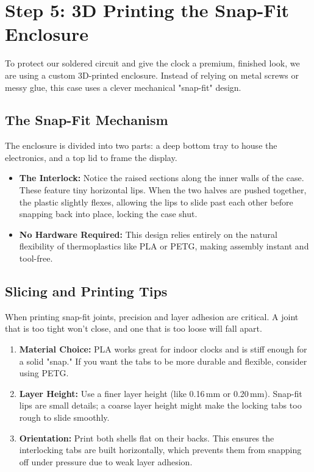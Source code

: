 \documentclass[11pt,a4paper]{article}
\begin{document}
\section{Step 5: 3D Printing the Snap-Fit Enclosure}
To protect our soldered circuit and give the clock a premium, finished look, we are using a custom 3D-printed enclosure. Instead of relying on metal screws or messy glue, this case uses a clever mechanical "snap-fit" design.

\subsection*{The Snap-Fit Mechanism}
The enclosure is divided into two parts: a deep bottom tray to house the electronics, and a top lid to frame the display. 
\begin{itemize}
    \item \textbf{The Interlock:} Notice the raised sections along the inner walls of the case. These feature tiny horizontal lips. When the two halves are pushed together, the plastic slightly flexes, allowing the lips to slide past each other before snapping back into place, locking the case shut.
    \item \textbf{No Hardware Required:} This design relies entirely on the natural flexibility of thermoplastics like PLA or PETG, making assembly instant and tool-free.
\end{itemize}


\subsection*{Slicing and Printing Tips}
When printing snap-fit joints, precision and layer adhesion are critical. A joint that is too tight won't close, and one that is too loose will fall apart.
\begin{enumerate}
    \item \textbf{Material Choice:} PLA works great for indoor clocks and is stiff enough for a solid "snap." If you want the tabs to be more durable and flexible, consider using PETG.
    \item \textbf{Layer Height:} Use a finer layer height (like 0.16\,mm or 0.20\,mm). Snap-fit lips are small details; a coarse layer height might make the locking tabs too rough to slide smoothly.
    \item \textbf{Orientation:} Print both shells flat on their backs. This ensures the interlocking tabs are built horizontally, which prevents them from snapping off under pressure due to weak layer adhesion.
\end{enumerate}
\end{document}
